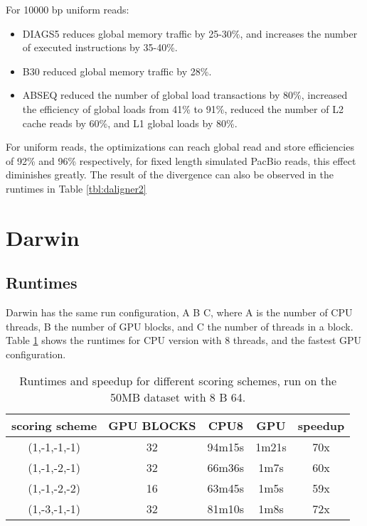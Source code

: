 \documentclass[../main/thesis.tex]{subfiles}
\begin{document}
For 10000 bp uniform reads:
\begin{itemize}
\item DIAGS5 reduces global memory traffic by 25-30\%, and increases the number of executed instructions by 35-40\%. \vspace{-10pt}
\item B30 reduced global memory traffic by 28\%. \vspace{-10pt}
\item ABSEQ reduced the number of global load transactions by 80\%, increased the efficiency of global loads from 41\% to 91\%, reduced the number of L2 cache reads by 60\%, and L1 global loads by 80\%.
\end{itemize}

For uniform reads, the optimizations can reach global read and store efficiencies of 92\% and 96\% respectively, for fixed length simulated PacBio reads, this effect diminishes greatly.
The result of the divergence can also be observed in the runtimes in Table \ref{tbl:daligner2}


\section{Darwin}
\subsection{Runtimes}
Darwin has the same run configuration, A B C, where A is the number of CPU threads, B the number of GPU blocks, and C the number of threads in a block.
Table \ref{tbl:darwin1} shows the runtimes for CPU version with 8 threads, and the fastest GPU configuration.

\begin{table}
\centering
\caption{Runtimes and speedup for different scoring schemes, run on the 50MB dataset with 8 B 64.}
\label{tbl:darwin1}
\begin{tabular}{c c c c c}
scoring scheme & GPU BLOCKS & CPU8 & GPU & speedup \\ \hline
(1,-1,-1,-1) & 32 & 94m15s & 1m21s & 70x \\
(1,-1,-2,-1) & 32 & 66m36s & 1m7s  & 60x \\
(1,-1,-2,-2) & 16 & 63m45s & 1m5s  & 59x \\
(1,-3,-1,-1) & 32 & 81m10s & 1m8s  & 72x \\
\end{tabular}
\end{table}
\end{document}
